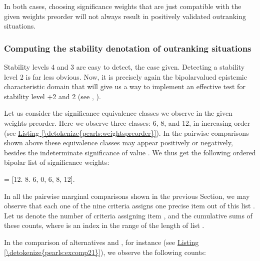 \documentclass[a4paper,12pt,english]{sphinxhowto}
\begin{document}
\sphinxAtStartPar
In both cases, choosing significance weights that are just compatible with the given weights preorder will not always result in positively validated  outranking situations.


\subsubsection{Computing the stability denotation of outranking situations}
\label{\detokenize{pearls:computing-the-stability-denotation-of-outranking-situations}}
\sphinxAtStartPar
Stability levels 4 and 3 are easy to detect, the case given. Detecting a stability level 2 is far less obvious.  Now, it is precisely again the bipolar\sphinxhyphen{}valued epistemic characteristic domain that will give us a way to implement an effective test for stability level +2 and \sphinxhyphen{}2 (see , ).

\sphinxAtStartPar
Let us consider the significance equivalence classes we observe in the given weights preorder. Here we observe three classes: 6, 8, and 12, in increasing order (see \hyperref[\detokenize{pearls:weightspreorder}]{Listing \ref{\detokenize{pearls:weightspreorder}}}). In the pairwise comparisons shown above these equivalence classes may appear positively or negatively, besides the indeterminate significance of value . We thus get the following ordered bipolar list of significance weights:

\sphinxAtStartPar
{} = {[}\sphinxhyphen{}12. \sphinxhyphen{}8. \sphinxhyphen{}6, 0, 6, 8, 12{]}.

\sphinxAtStartPar
In all the pairwise marginal comparisons shown in the previous Section, we may observe that each one of the nine criteria assigns one precise item out of this list . Let us denote  the number of criteria assigning item , and  the cumulative sums of these  counts, where  is an index in the range of the length of list .

\sphinxAtStartPar
In the comparison of alternatives  and , for instance (see \hyperref[\detokenize{pearls:excomp21}]{Listing \ref{\detokenize{pearls:excomp21}}}), we observe the following counts:
\end{document}
